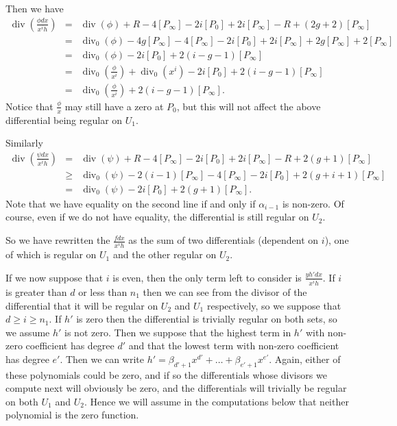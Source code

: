 \documentclass[draft, 11pt]{article} %
\theoremstyle{plain}
\theoremstyle{remark}
\DeclareMathOperator{\di}{div}
\begin{document}
Then we have
\begin{eqnarray*}
\di \left( \frac{\phi dx}{x^i h} \right) & = & \di(\phi) + R - 4[P_\infty] - 2i[P_0] + 2i[P_\infty] - R + (2g+2) [P_\infty] \\
& = & \di_0(\phi) - 4g[P_\infty] - 4[P_\infty] - 2i[P_0] + 2i[P_\infty] + 2g[P_\infty] + 2[P_\infty] \\
& = & \di_0(\phi) - 2i[P_0] + 2(i-g-1)[P_\infty] \\
& = & \di_0\left( \frac{\phi}{x^i} \right) + \di_0( x^i) - 2i[P_0] + 2(i-g-1)[P_\infty] \\
& = & \di_0 \left( \frac{\phi}{x^i} \right) + 2(i-g-1)[P_\infty].
\end{eqnarray*}
Notice that $\frac{\phi}{x}$ may still have a zero at $P_0$, but this will not affect the above differential being regular on $U_1$.




Similarly 
\begin{eqnarray*}
\di\left( \frac{\psi dx}{x^ih} \right) & = & \di(\psi) + R - 4[P_\infty] - 2i[P_0] + 2i[P_\infty] - R + 2(g+1)[P_\infty] \\
& \geq & \di_0(\psi ) - 2(i-1)[P_\infty] - 4[P_\infty] - 2i[P_0] + 2(g+i + 1)[P_\infty] \\
& = & \di_0(\psi) - 2i[P_0] + 2(g+1)[P_\infty].
\end{eqnarray*}
Note that we have equality on the second line if and only if $\alpha_{i-1}$ is non-zero.
Of course, even if we do not have equality, the differential is still regular on $U_2$.



So we have rewritten the $\frac{fdx}{x^ih}$ as the sum of two differentials (dependent on $i$), one of which is regular on $U_1$ and the other regular on $U_2$.



If we now suppose that $i$ is even, then the only term left to consider is
$\frac{yh'dx}{x^ih}$.
If $i$ is greater than $d$ or less than $n_1$ then we can see from the divisor of the differential that it will be regular on $U_2$ and $U_1$ respectively, so we suppose that $d \geq i \geq n_1$.
If $h'$ is zero then the differential is trivially regular on both sets, so we assume $h'$ is not zero.
Then we suppose that the highest term in $h'$ with non-zero coefficient has degree $d'$ and that the lowest term with non-zero coefficient has degree $e'$.
Then we can write $h' = \beta_{d'+1} x^{d'} + \ldots + \beta_{e'+1} x^{e'}$.
Again, either of these polynomials could be zero, and if so the differentials whose divisors we compute next will obviously be zero, and the differentials will trivially be regular on both $U_1$ and $U_2$.
Hence we will assume in the computations below that neither polynomial is the zero function.
\end{document}
